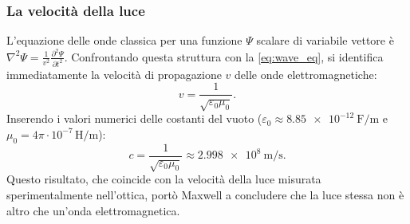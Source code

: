 \documentclass[a4paper,11pt]{report}
\begin{document}
\subsubsection{La velocità della luce}
L'equazione delle onde classica per una funzione $\Psi$ scalare di variabile vettore è $\nabla^2 \Psi = \frac{1}{v^2}\frac{\partial^2 \Psi}{\partial t^2}$. Confrontando questa struttura con la \eqref{eq:wave_eq}, si identifica immediatamente la velocità di propagazione $v$ delle onde elettromagnetiche:
\begin{equation}
v = \frac{1}{\sqrt{\varepsilon_0 \mu_0}}.
\end{equation}
Inserendo i valori numerici delle costanti del vuoto ($\varepsilon_0 \approx \SI{8.85e-12}{\farad\per\meter}$ e $\mu_0 = 4\pi \cdot 10^{-7} \, \si{\henry\per\meter}$):
\begin{equation}
c = \frac{1}{\sqrt{\varepsilon_0 \mu_0}} \approx \SI{2.998e8}{\meter\per\second}.
\end{equation}
Questo risultato, che coincide con la velocità della luce misurata sperimentalmente nell'ottica, portò Maxwell a concludere che la luce stessa non è altro che un'onda elettromagnetica.
\end{document}
